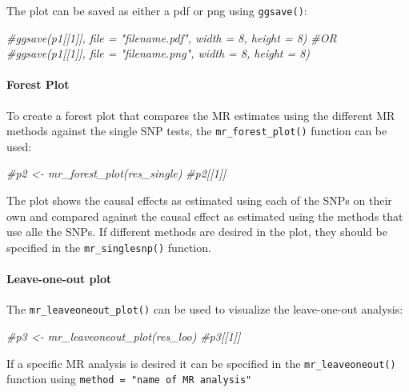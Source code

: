 \documentclass[
]{article}
\newenvironment{Shaded}{\begin{snugshade}}{\end{snugshade}}
\newcommand{\CommentTok}[1]{\textcolor[rgb]{0.56,0.35,0.01}{\textit{#1}}}
\begin{document}
The plot can be saved as either a pdf or png using \texttt{ggsave()}:

\begin{Shaded}
\begin{Highlighting}[]
\CommentTok{\#ggsave(p1[[1]], file = "filename.pdf", width = 8, height = 8)}
\CommentTok{\#OR}
\CommentTok{\#ggsave(p1[[1]], file = "filename.png", width = 8, height = 8)}
\end{Highlighting}
\end{Shaded}

\paragraph{Forest Plot}\label{forest-plot}

To create a forest plot that compares the MR estimates using the
different MR methods against the single SNP tests, the
\texttt{mr\_forest\_plot()} function can be used:

\begin{Shaded}
\begin{Highlighting}[]
\CommentTok{\#p2 \textless{}{-} mr\_forest\_plot(res\_single)}
\CommentTok{\#p2[[1]]}
\end{Highlighting}
\end{Shaded}

The plot shows the causal effects as estimated using each of the SNPs on
their own and compared against the causal effect as estimated using the
methods that use alle the SNPs. If different methods are desired in the
plot, they should be specified in the \texttt{mr\_singlesnp()} function.

\paragraph{Leave-one-out plot}\label{leave-one-out-plot}

The \texttt{mr\_leaveoneout\_plot()} can be used to visualize the
leave-one-out analysis:

\begin{Shaded}
\begin{Highlighting}[]
\CommentTok{\#p3 \textless{}{-} mr\_leaveoneout\_plot(res\_loo)}
\CommentTok{\#p3[[1]]}
\end{Highlighting}
\end{Shaded}

If a specific MR analysis is desired it can be specified in the
\texttt{mr\_leaveoneout()} function using
\texttt{method\ =\ "name\ of\ MR\ analysis"}
\end{document}
